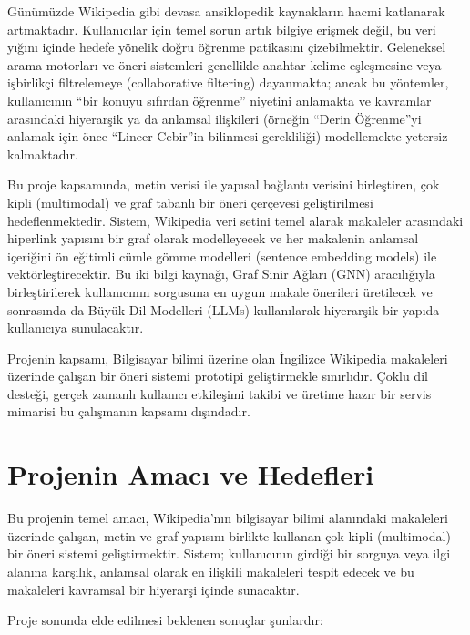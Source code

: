 \documentclass[12pt, a4paper]{article}
\begin{document}
Günümüzde Wikipedia gibi devasa ansiklopedik kaynakların hacmi katlanarak artmaktadır. Kullanıcılar için temel sorun artık bilgiye erişmek değil, bu veri yığını içinde hedefe yönelik doğru öğrenme patikasını çizebilmektir. Geleneksel arama motorları ve öneri sistemleri genellikle anahtar kelime eşleşmesine veya işbirlikçi filtrelemeye (collaborative filtering) dayanmakta; ancak bu yöntemler, kullanıcının ``bir konuyu sıfırdan öğrenme'' niyetini anlamakta ve kavramlar arasındaki hiyerarşik ya da anlamsal ilişkileri (örneğin ``Derin Öğrenme''yi anlamak için önce ``Lineer Cebir''in bilinmesi gerekliliği) modellemekte yetersiz kalmaktadır.

Bu proje kapsamında, metin verisi ile yapısal bağlantı verisini birleştiren, çok kipli (multimodal) ve graf tabanlı bir öneri çerçevesi geliştirilmesi hedeflenmektedir. Sistem, Wikipedia veri setini temel alarak makaleler arasındaki hiperlink yapısını bir graf olarak modelleyecek ve her makalenin anlamsal içeriğini ön eğitimli cümle gömme modelleri (sentence embedding models) ile vektörleştirecektir. Bu iki bilgi kaynağı, Graf Sinir Ağları (GNN) aracılığıyla birleştirilerek kullanıcının sorgusuna en uygun makale önerileri üretilecek ve sonrasında da Büyük Dil Modelleri (LLMs) kullanılarak hiyerarşik bir yapıda kullanıcıya sunulacaktır.

Projenin kapsamı, Bilgisayar bilimi üzerine olan İngilizce Wikipedia makaleleri üzerinde çalışan bir öneri sistemi prototipi geliştirmekle sınırlıdır. Çoklu dil desteği, gerçek zamanlı kullanıcı etkileşimi takibi ve üretime hazır bir servis mimarisi bu çalışmanın kapsamı dışındadır.

\section{Projenin Amacı ve Hedefleri}

Bu projenin temel amacı, Wikipedia'nın bilgisayar bilimi alanındaki makaleleri üzerinde çalışan, metin ve graf yapısını birlikte kullanan çok kipli (multimodal) bir öneri sistemi geliştirmektir. Sistem; kullanıcının girdiği bir sorguya veya ilgi alanına karşılık, anlamsal olarak en ilişkili makaleleri tespit edecek ve bu makaleleri kavramsal bir hiyerarşi içinde sunacaktır.

Proje sonunda elde edilmesi beklenen sonuçlar şunlardır:
\end{document}
